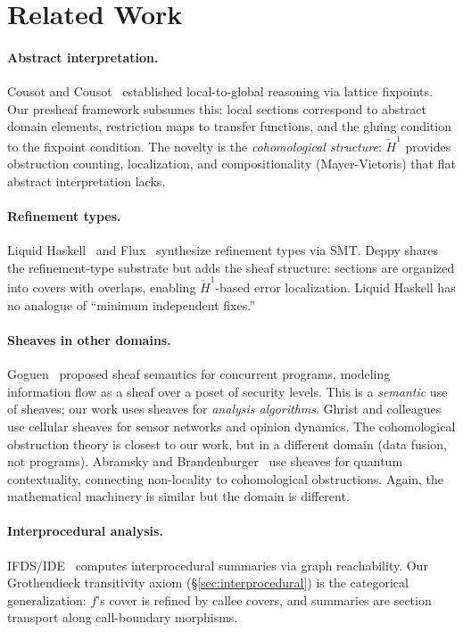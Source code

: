 \documentclass[acmsmall,screen,review,anonymous]{acmart}
\theoremstyle{remark}
\newcommand{\Hc}[1]{\check{H}^{#1}}
\begin{document}
\section{Related Work}\label{sec:related}

\paragraph{Abstract interpretation.}
Cousot and Cousot~\cite{CousotCousot77} established local-to-global
reasoning via lattice fixpoints.  Our presheaf framework subsumes this:
local sections correspond to abstract domain elements, restriction maps
to transfer functions, and the gluing condition to the fixpoint
condition.  The novelty is the \emph{cohomological structure}: $\Hc{1}$
provides obstruction counting, localization, and compositionality
(Mayer-Vietoris) that flat abstract interpretation lacks.

\paragraph{Refinement types.}
Liquid Haskell~\cite{VazouSeidel14} and Flux~\cite{Flux} synthesize
refinement types via SMT.  Deppy shares the refinement-type substrate
but adds the sheaf structure: sections are organized into covers with
overlaps, enabling $\Hc{1}$-based error localization.  Liquid Haskell
has no analogue of ``minimum independent fixes.''

\paragraph{Sheaves in other domains.}
Goguen~\cite{Goguen92} proposed sheaf semantics for concurrent programs,
modeling information flow as a sheaf over a poset of security levels.
This is a \emph{semantic} use of sheaves; our work uses sheaves for
\emph{analysis algorithms}.
Ghrist and colleagues~\cite{Ghrist14,HansenGhrist19} use cellular
sheaves for sensor networks and opinion dynamics.  The cohomological
obstruction theory is closest to our work, but in a different domain
(data fusion, not programs).
Abramsky and Brandenburger~\cite{AbramskyBrandenburger11} use sheaves
for quantum contextuality, connecting non-locality to cohomological
obstructions.  Again, the mathematical machinery is similar but the
domain is different.

\paragraph{Interprocedural analysis.}
IFDS/IDE~\cite{RepsHorwitzSagiv95} computes interprocedural summaries
via graph reachability.  Our Grothendieck transitivity axiom
(\S\ref{sec:interprocedural}) is the categorical generalization:
$f$'s cover is refined by callee covers, and summaries are section
transport along call-boundary morphisms.
\end{document}
